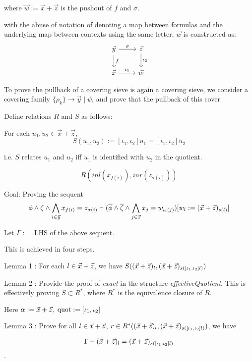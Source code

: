 where $\vec{w}:= \vec{x}+ \vec{z}$ is the pushout of $f$ and $\sigma$.

with the abuse of notation of denoting a map between formulas and the underlying map between contexts using the same letter, $\vec{w}$ is constructed as:
\[
\begin{tikzcd}
 \vec{y}\ar[d,"f"]\ar[r,"\sigma"] & \vec{z}\ar[d,"\iota_2"]\\
 \vec{x}\ar[r,"\iota_1"] & \vec{w}
\end{tikzcd}
\]






To prove the pullback of a covering sieve is again a covering sieve, we consider a covering family $\{\rho_k\}\to \vec{y}\mid \psi$, and prove that the pullback of this cover

\begin{definition}
\end{definition}



Define relations $R$ and $S$ as follows:

For each $u_1,u_2\in \vec{x}+\vec{z}$,
\[S(u_1,u_2):= [\iota_1,\iota_2]u_1 =  [\iota_1,\iota_2]u_2\]

i.e. $S$ relates $u_1$ and $u_2$ iff $u_1$ is identified with $u_2$ in the quotient.

\[R(inl(x_{f(i)}),inr(z_{\sigma(i)}))\]

Goal: Proving the sequent
\[\phi\land \zeta\land \bigwedge_{i\in \vec{y}} x_{f(i)} = z_{\sigma(i)}\vdash (\overline{\phi}\land \overline{\zeta}\land\bigwedge_{j\in\vec{x}} x_j = w_{\iota_i(j)})[w_l:=(\vec{x}+\vec{z})_{s(l)}] \]

Let $\Gamma :=$ LHS of the above sequent.

This is achieved in four steps.

Lemma 1 : For each $l\in \vec{x}+\vec{z}$, we have $S((\vec{x}+\vec{z})_l, (\vec{x}+\vec{z})_{s([\iota_1,\iota_2] l)})$

Lemma 2 : Provide the proof of \emph{exact} in the structure \emph{effectiveQuotient}. This is effectively proving $S\subset R^*$, where $R^*$ is the equivalence closure of $R$.

Here $\alpha:= \vec{x}+\vec{z}$, $\text{quot}:= [\iota_1,\iota_2]$

Lemma 3 : Prove for all $l\in \vec{x}+\vec{z}$, $r\in R^*((\vec{x}+\vec{z})_l,(\vec{x}+\vec{z})_{s([\iota_1,\iota_2] l)})$, we have


\[\Gamma \vdash (\vec{x}+\vec{z})_l = (\vec{x}+\vec{z})_{s([\iota_1,\iota_2] l)}\].

